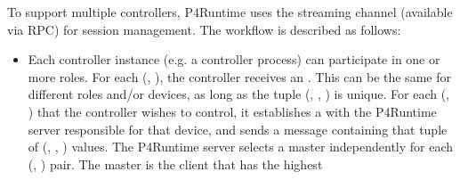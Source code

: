 \documentclass[11pt]{article}
\begin{document}
{%
\noindent{}To support multiple controllers, P4Runtime uses the streaming channel (available
via  RPC) for session management. The workflow is described as
follows:%

\begin{itemize}%

\item{}
Each controller instance (e.g. a controller process) can participate in one or
more roles. For each (, ), the controller receives an
. This  can be the same for different roles and/or
devices, as long as the tuple (, , ) is
unique. For each (, ) that the controller wishes to
control, it establishes a  with the P4Runtime server
responsible for that device, and sends a  message
containing that tuple of (, , ) values. The
P4Runtime server selects a master independently for each (,
) pair. The master is the client that has the highest 

\end{itemize}}
\end{document}
